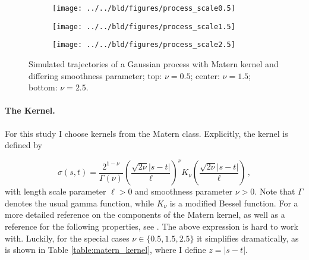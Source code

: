 \begin{figure}

\centering
\begin{subfigure}[b]{\textwidth}
\begin{tcolorbox}[standard jigsaw, opacityback=0, top=0pt, left=0pt, right=0pt, bottom=0pt]
    \texttt{[image: ../../bld/figures/process\_scale0.5]}
\end{tcolorbox}
\end{subfigure}

\hfill

\begin{subfigure}[b]{\textwidth}
\centering
\begin{tcolorbox}[standard jigsaw, opacityback=0, top=0pt, left=0pt, right=0pt, bottom=0pt]
    \texttt{[image: ../../bld/figures/process\_scale1.5]}
\end{tcolorbox}
\end{subfigure}

\hfill

\begin{subfigure}[b]{\textwidth}
\centering
\begin{tcolorbox}[standard jigsaw, opacityback=0, top=0pt, left=0pt, right=0pt, bottom=0pt]
    \texttt{[image: ../../bld/figures/process\_scale2.5]}
\end{tcolorbox}
\end{subfigure}

\caption{Simulated trajectories of a Gaussian process with Matern kernel and differing
smoothness parameter; top: $\nu = 0.5$; center: $\nu = 1.5$; bottom: $\nu = 2.5$.}
\label{figure:process_scale_comparison}
\end{figure}


\paragraph{The Kernel.}

For this study I choose kernels from the Matern class. Explicitly, the kernel is defined
by

\[
    \sigma(s, t) = \frac{2^{1 - \nu}}{\Gamma(\nu)} \left(
    \frac{\sqrt{2 \nu} |s - t|}{\ell} \right)^\nu K_{\nu} \left( \frac{\sqrt{2 \nu} |s -
    t|}{\ell} \right) \,,
\]
with length scale parameter $\ell > 0$ and smoothness parameter $\nu > 0$. Note that
$\Gamma$ denotes the usual gamma function, while $K_{\nu}$ is a modified Bessel
function. For a more detailed reference on the components of the Matern kernel, as well
as a reference for the following properties, see \cite{Rasmussen2006}. The above
expression is hard to work with. Luckily, for the special cases $\nu \in \{0.5, 1.5,
2.5\}$ it simplifies dramatically, as is shown in Table \ref{table:matern_kernel}, where
I define $z = |s - t|$.

